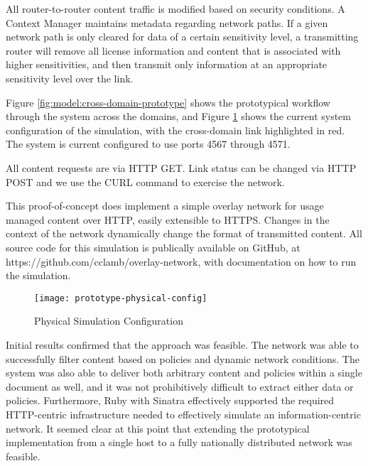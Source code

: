 All router-to-router content traffic is modified based on security conditions.  A Context Manager maintains metadata regarding network paths.  If a given network path is only cleared for data of a certain sensitivity level, a transmitting router will remove all license information and content that is associated with higher sensitivities, and then transmit only information at an appropriate sensitivity level over the link.

Figure \ref{fig:model:cross-domain-prototype} shows the prototypical workflow through the system across the domains, and Figure \ref{fig:model:prototype-physical-config} shows the current system configuration of the simulation, with the cross-domain link highlighted in red.  The system is current configured to use ports 4567 through 4571.

All content requests are via HTTP GET.  Link status can be changed via HTTP POST and we use the CURL command to exercise the network.

This proof-of-concept does implement a simple overlay network for usage managed content over HTTP, easily extensible to HTTPS.  Changes in the context of the network dynamically change the format of transmitted content.  All source code for this simulation is publically available on GitHub, at https://github.com/cclamb/overlay-network, with documentation on how to run the simulation.

\begin{figure}[!t]
\centering
\texttt{[image: prototype-physical-config]}
\caption{Physical Simulation Configuration}
\label{fig:model:prototype-physical-config}
\end{figure}

Initial results confirmed that the approach was feasible.  The network was able to successfully filter content based on policies and dynamic network conditions.  The system was also able to deliver both arbitrary content and policies within a single document as well, and it was not prohibitively difficult to extract either data or policies.  Furthermore, Ruby with Sinatra effectively supported the required HTTP-centric infrastructure needed to effectively simulate an information-centric network.  It seemed clear at this point that extending the prototypical implementation from a single host to a fully nationally distributed network was feasible.

